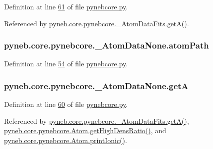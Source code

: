 Definition at line \hyperlink{pynebcore_8py_source_l00061}{61} of file \hyperlink{pynebcore_8py_source}{pynebcore.\+py}.



Referenced by \hyperlink{pynebcore_8py_source_l00205}{pyneb.\+core.\+pynebcore.\+\_\+\+Atom\+Data\+Fits.\+get\+A()}.

\hypertarget{classpyneb_1_1core_1_1pynebcore_1_1___atom_data_none_aa255a7f490aa5d1cf7cfee7c5eb388ae}{}
\subsubsection[{atom\+Path}]{\setlength{\rightskip}{0pt plus 5cm}pyneb.\+core.\+pynebcore.\+\_\+\+Atom\+Data\+None.\+atom\+Path}\label{classpyneb_1_1core_1_1pynebcore_1_1___atom_data_none_aa255a7f490aa5d1cf7cfee7c5eb388ae}


Definition at line \hyperlink{pynebcore_8py_source_l00054}{54} of file \hyperlink{pynebcore_8py_source}{pynebcore.\+py}.

\hypertarget{classpyneb_1_1core_1_1pynebcore_1_1___atom_data_none_a44aa15dc5314c07627944e86581631b1}{}
\subsubsection[{get\+A}]{\setlength{\rightskip}{0pt plus 5cm}pyneb.\+core.\+pynebcore.\+\_\+\+Atom\+Data\+None.\+get\+A}\label{classpyneb_1_1core_1_1pynebcore_1_1___atom_data_none_a44aa15dc5314c07627944e86581631b1}


Definition at line \hyperlink{pynebcore_8py_source_l00060}{60} of file \hyperlink{pynebcore_8py_source}{pynebcore.\+py}.



Referenced by \hyperlink{pynebcore_8py_source_l00205}{pyneb.\+core.\+pynebcore.\+\_\+\+Atom\+Data\+Fits.\+get\+A()}, \hyperlink{pynebcore_8py_source_l01653}{pyneb.\+core.\+pynebcore.\+Atom.\+get\+High\+Dens\+Ratio()}, and \hyperlink{pynebcore_8py_source_l02167}{pyneb.\+core.\+pynebcore.\+Atom.\+print\+Ionic()}.

